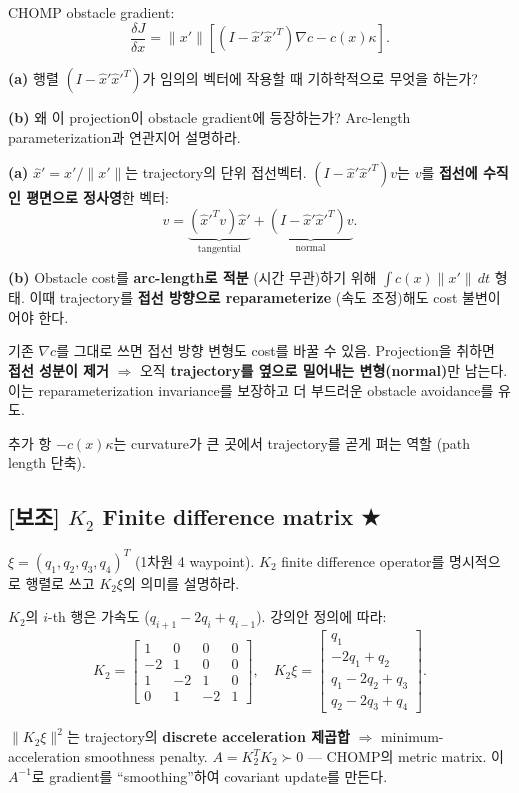 \documentclass[11pt,a4paper]{article}
\begin{document}
\begin{prob}
CHOMP obstacle gradient:
\[
\frac{\delta J}{\delta x} = \|x'\|\left[(I - \hat x'\hat x'^T)\nabla c - c(x)\kappa\right].
\]

\textbf{(a)} 행렬 $(I - \hat x'\hat x'^T)$가 임의의 벡터에 작용할 때 기하학적으로 무엇을 하는가?

\textbf{(b)} 왜 이 projection이 obstacle gradient에 등장하는가? Arc-length parameterization과 연관지어 설명하라.
\end{prob}

\begin{sol}
\textbf{(a)} $\hat x' = x'/\|x'\|$는 trajectory의 단위 접선벡터. $(I - \hat x'\hat x'^T)v$는 $v$를 \textbf{접선에 수직인 평면으로 정사영}한 벡터:
\[
v = \underbrace{(\hat x'^T v)\hat x'}_{\text{tangential}} + \underbrace{(I - \hat x'\hat x'^T)v}_{\text{normal}}.
\]

\textbf{(b)} Obstacle cost를 \textbf{arc-length로 적분} (시간 무관)하기 위해 $\int c(x)\|x'\|\,dt$ 형태. 이때 trajectory를 \textbf{접선 방향으로 reparameterize} (속도 조정)해도 cost 불변이어야 한다.

기존 $\nabla c$를 그대로 쓰면 접선 방향 변형도 cost를 바꿀 수 있음. Projection을 취하면 \textbf{접선 성분이 제거} $\Rightarrow$ 오직 \textbf{trajectory를 옆으로 밀어내는 변형(normal)}만 남는다. 이는 reparameterization invariance를 보장하고 더 부드러운 obstacle avoidance를 유도.

추가 항 $-c(x)\kappa$는 curvature가 큰 곳에서 trajectory를 곧게 펴는 역할 (path length 단축).
\end{sol}

\subsection*{[보조] $K_2$ Finite difference matrix \hfill ★}

\begin{prob}
$\xi = (q_1, q_2, q_3, q_4)^T$ (1차원 4 waypoint). $K_2$ finite difference operator를 명시적으로 행렬로 쓰고 $K_2\xi$의 의미를 설명하라.
\end{prob}

\begin{sol}
$K_2$의 $i$-th 행은 가속도 ($q_{i+1} - 2q_i + q_{i-1}$). 강의안 정의에 따라:
\[
K_2 = \begin{bmatrix}1 & 0 & 0 & 0\\-2 & 1 & 0 & 0\\1 & -2 & 1 & 0\\0 & 1 & -2 & 1\end{bmatrix},\quad K_2\xi = \begin{bmatrix}q_1\\-2q_1 + q_2\\q_1 - 2q_2 + q_3\\q_2 - 2q_3 + q_4\end{bmatrix}.
\]

$\|K_2\xi\|^2$는 trajectory의 \textbf{discrete acceleration 제곱합} $\Rightarrow$ minimum-acceleration smoothness penalty. $A = K_2^T K_2 \succ 0$ --- CHOMP의 metric matrix. 이 $A^{-1}$로 gradient를 ``smoothing''하여 covariant update를 만든다.
\end{sol}
\end{document}
